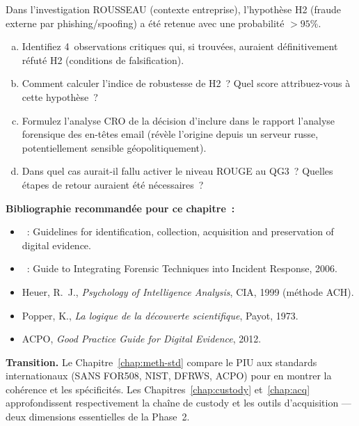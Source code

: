 \begin{boxexo}[title={\ding{45}\quad Exercice~6.3 --- Falsification active \niveauexpert}]
Dans l'investigation ROUSSEAU (contexte entreprise), l'hypothèse H2
(fraude externe par phishing/spoofing) a été retenue avec une probabilité
$> 95\%$.

\begin{enumerate}[(a)]
    \item Identifiez 4~observations critiques qui, si trouvées, auraient
          définitivement réfuté H2 (conditions de falsification).
    \item Comment calculer l'indice de robustesse de H2~? Quel score
          attribuez-vous à cette hypothèse~?
    \item Formulez l'analyse CRO de la décision d'inclure dans le rapport
          l'analyse forensique des en-têtes email (révèle l'origine depuis
          un serveur russe, potentiellement sensible géopolitiquement).
    \item Dans quel cas aurait-il fallu activer le niveau ROUGE au QG3~?
          Quelles étapes de retour auraient été nécessaires~?
\end{enumerate}
\end{boxexo}

\bigskip

\begin{boxinfo}
\textbf{Bibliographie recommandée pour ce chapitre~:}
\begin{itemize}
    \item {}~: Guidelines for identification,
          collection, acquisition and preservation of digital evidence.
    \item {}~: Guide to Integrating Forensic Techniques
          into Incident Response, 2006.
    \item Heuer, R.~J.,
          \textit{Psychology of Intelligence Analysis},
          CIA, 1999 (méthode ACH). \cite{heuer1999}
    \item Popper, K., \textit{La logique de la découverte scientifique},
          Payot, 1973. \cite{popper1973}
    \item ACPO, \textit{Good Practice Guide for Digital Evidence}, 2012.
\end{itemize}
\textbf{Transition.} Le Chapitre~\ref{chap:meth-std} compare le PIU aux
standards internationaux (SANS FOR508, NIST, DFRWS, ACPO) pour en
montrer la cohérence et les spécificités. Les Chapitres~\ref{chap:custody}
et~\ref{chap:acq} approfondissent respectivement la chaîne de custody
et les outils d'acquisition --- deux dimensions essentielles de la Phase~2.
\end{boxinfo}